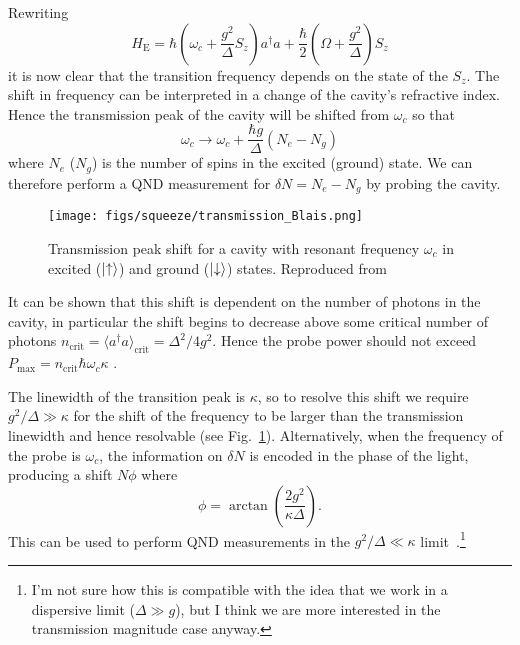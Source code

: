 \documentclass{article}
\begin{document}
Rewriting
%
\begin{equation}
  H_\text{E}= 
    \hbar \left(\omega_c + \frac{g^2}{\Delta}S_z\right)a^\dagger a + 
    \frac{\hbar}{2}\left(\Omega + \frac{g^2}{\Delta}\right)S_z
\end{equation}
%
it is now clear that the transition frequency depends on the state of the
$S_z$. The shift in frequency can be interpreted in a change of the cavity's
refractive index. Hence the transmission peak of the cavity will be shifted
from $\omega_c$ so that
%
\begin{equation}
  \omega_c \rightarrow \omega_c + \frac{\hbar g}{\Delta}(N_e - N_g)
\end{equation}
%
where $N_e$ ($N_g$) is the number of spins in the excited (ground) state. We
can therefore perform a QND measurement for $\delta N = N_e - N_g$ by probing
the cavity.

\begin{figure}
  \centering
  \texttt{[image: figs/squeeze/transmission\_Blais.png]}
  \caption{Transmission peak shift for a cavity with resonant frequency
  $\omega_c$ in excited ($\ket{\uparrow}$) and ground ($\ket{\downarrow}$)
  states.  Reproduced from~\cite{PhysRevA.69.062320}}
  \label{transmission}
\end{figure}

It can be shown that this shift is dependent on the number of photons in the
cavity, in particular the shift begins to decrease above some critical number
of photons $n_\text{crit} = \langle a^\dagger a\rangle_\text{crit} = \Delta^2/4g^2$.
Hence the probe power should not exceed $P_\text{max} = n_\text{crit}\hbar
\omega_c \kappa$ \cite{PhysRevA.69.062320}.

The linewidth of the transition peak is $\kappa$, so to resolve this shift we
require $g^2/ \Delta \gg \kappa$ for the shift of the frequency to be larger
than the transmission linewidth and hence resolvable (see
Fig.~\ref{transmission}). Alternatively, when the frequency of the probe is
$\omega_c$, the information on $\delta N$ is encoded in the phase of the light,
producing a shift $N\phi$ where
%
\begin{equation}
  \phi = \arctan \left(\frac{2g^2}{\kappa \Delta}\right).
\end{equation}
%
This can be used to perform QND measurements in the $g^2/ \Delta \ll
\kappa$ limit~\cite{PhysRevA.69.062320}.\footnote{I'm not sure how this is
compatible with the idea that we work in a dispersive limit ($\Delta \gg g$),
but I think we are more interested in the transmission magnitude case anyway.}
\end{document}
